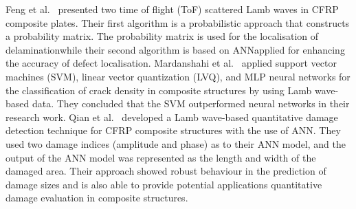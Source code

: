 Feng et al.~\cite{feng2019locating} presented two \DIFaddbegin {}\DIFaddend time of flight (ToF) \DIFdelbegin {}\DIFdelend \DIFaddbegin {}\DIFaddend scattered Lamb waves in CFRP composite plates.
Their first algorithm is a probabilistic approach that constructs a probability matrix. 
The probability matrix is used for the localisation of delamination\DIFaddbegin \DIFadd{, }\DIFaddend while their second algorithm is based on ANN\DIFdelbegin {}\DIFdelend \DIFaddbegin {}\DIFaddend applied for enhancing the accuracy of defect localisation.
Mardanshahi et al.~\cite{mardanshahi2020detection} applied support vector machines (SVM), linear vector quantization (LVQ), and MLP neural networks for the classification of crack density in composite structures by using Lamb wave-based data.
They concluded that the SVM outperformed \DIFdelbegin {}\DIFdelend \DIFaddbegin {}\DIFaddend neural networks in their research work.
Qian et al.~\cite{qian2020application} developed a Lamb wave-based quantitative damage detection technique for CFRP composite structures with the use of ANN.
They used two damage indices (amplitude and phase) as \DIFdelbegin {}\DIFdelend \DIFaddbegin {}\DIFaddend to their ANN model, and the output of the ANN model was represented as the length and width of the damaged area.
Their approach showed \DIFdelbegin {}\DIFdelend robust behaviour in the prediction of damage sizes and is also able to provide potential applications \DIFdelbegin {}\DIFdelend \DIFaddbegin {}\DIFaddend quantitative damage evaluation in composite structures.

